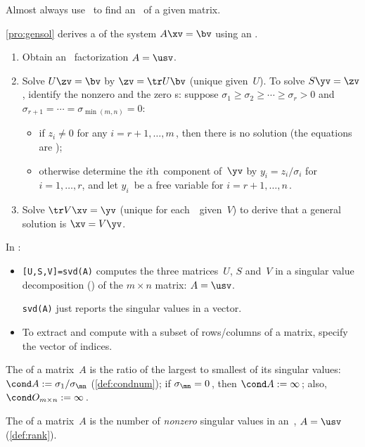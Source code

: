 \begin{itemize}
Almost always use \script\ to find an \svd\ of a given matrix.

\itemhi \autoref{pro:gensol} derives a  of the system $A\xv=\bv$ using an \svd.
\begin{enumerate}
\item Obtain an \svd\ factorization \(A=\usv\).
\item Solve \(U\zv=\bv\) by $\zv=\tr U\bv$ (unique given~\(U\)).
\itemme To solve \(S\yv=\zv\), identify the nonzero and the zero s: suppose \(\sigma_1\geq\sigma_2\geq\cdots\geq\sigma_r>0\) and \(\sigma_{r+1}=\cdots=\sigma_{\min(m,n)}=0\):
\begin{itemize}
\item if $z_i\neq0$ for any \(i=r+1,\ldots,m\)\,, then there is {no solution} (the equations are );
\item otherwise determine the $i$th~component of~$\yv$ by
$y_i=z_i/\sigma_i$ for $i=1,\ldots,r$, and let $y_i$~be a {free variable} for $i=r+1,\ldots,n$\,. 
\end{itemize}

\item Solve \(\tr V\xv=\yv\) (unique for each~\yv\ given~\(V\)) to derive that a general solution is $\xv=V\yv$.
\end{enumerate}

\itemhi In \script:
\begin{itemize}
\item {}\verb|[U,S,V]=svd(A)| computes the three matrices~\(U\), \(S\) and~\(V\) in a singular value decomposition (\svd) of the \(m\times n\) matrix: \(A=\usv\).

\verb|svd(A)| just reports the singular values in a vector.

\item To extract and compute with a subset of rows\slash columns of a matrix, specify the vector of indices.
\end{itemize}


\itemme The  of a matrix~\(A\) is the ratio of the largest to smallest of its {singular value}s: \(\cond A:=\sigma_1/\sigma_{\mn}\) (\autoref{def:condnum}); 
if \(\sigma_{\mn}=0\)\,, then \(\cond A:=\infty\)\,; 
also, \(\cond O_{m\times n}:=\infty\)\,.

\itemhi The  of a matrix~$A$ is the number of \emph{nonzero} {singular value}s in an~\svd, \(A=\usv\) (\autoref{def:rank}).


\end{itemize}
